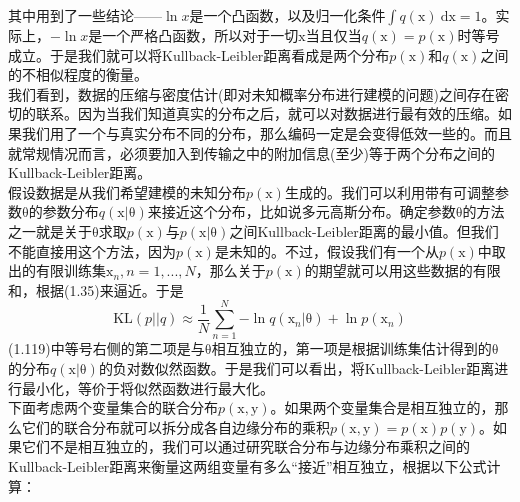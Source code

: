 \documentclass[b5paper]{book}
\numberwithin{equation}{chapter}
\begin{document}
{	其中用到了一些结论——$\ln x$是一个凸函数，以及归一化条件$\int q(\boldsymbol{\mathrm{x}})\ \mathrm{d}\boldsymbol{\mathrm{x}} = 1$。实际上，$-\ln x$是一个严格凸函数，所以对于一切$\boldsymbol{\mathrm{x}}$当且仅当$q(\boldsymbol{\mathrm{x}})=p(\boldsymbol{\mathrm{x}})$时等号成立。于是我们就可以将Kullback-Leibler距离看成是两个分布$p(\boldsymbol{\mathrm{x}})$和$q(\boldsymbol{\mathrm{x}})$之间的不相似程度的衡量。\\
	\indent 我们看到，数据的压缩与密度估计(即对未知概率分布进行建模的问题)之间存在密切的联系。因为当我们知道真实的分布之后，就可以对数据进行最有效的压缩。如果我们用了一个与真实分布不同的分布，那么编码一定是会变得低效一些的。而且就常规情况而言，必须要加入到传输之中的附加信息(至少)等于两个分布之间的Kullback-Leibler距离。\\
	\indent 假设数据是从我们希望建模的未知分布$p(\boldsymbol{\mathrm{x}})$生成的。我们可以利用带有可调整参数$\boldsymbol{\mathrm{\theta}}$的参数分布$q(\boldsymbol{\mathrm{x}}|\boldsymbol{\mathrm{\theta}})$来接近这个分布，比如说多元高斯分布。确定参数$\boldsymbol{\mathrm{\theta}}$的方法之一就是关于$\boldsymbol{\mathrm{\theta}}$求取$p(\boldsymbol{\mathrm{x}})$与$p(\boldsymbol{\mathrm{x}}|\boldsymbol{\mathrm{\theta}})$之间Kullback-Leibler距离的最小值。但我们不能直接用这个方法，因为$p(\boldsymbol{\mathrm{x}})$是未知的。不过，假设我们有一个从$p(\boldsymbol{\mathrm{x}})$中取出的有限训练集$\boldsymbol{\mathrm{x}}_n, n=1,...,N$，那么关于$p(\boldsymbol{\mathrm{x}})$的期望就可以用这些数据的有限和，根据(1.35)来逼近。于是
	\begin{equation}
		\mathrm{KL}(p||q)\approx \frac{1}{N}\sum_{n=1}^{N}{-\ln q(\boldsymbol{\mathrm{x}}_n|\boldsymbol{\mathrm{\theta}})+\ln p(\boldsymbol{\mathrm{x}}_n)}
	\end{equation}
	(1.119)中等号右侧的第二项是与$\boldsymbol{\mathrm{\theta}}$相互独立的，第一项是根据训练集估计得到的$\boldsymbol{\mathrm{\theta}}$的分布$q(\boldsymbol{\mathrm{x}}|\boldsymbol{\mathrm{\theta}})$的负对数似然函数。于是我们可以看出，将Kullback-Leibler距离进行最小化，等价于将似然函数进行最大化。\\
	\indent 下面考虑两个变量集合的联合分布$p(\boldsymbol{\mathrm{x}},\boldsymbol{\mathrm{y}})$。如果两个变量集合是相互独立的，那么它们的联合分布就可以拆分成各自边缘分布的乘积$p(\boldsymbol{\mathrm{x}},\boldsymbol{\mathrm{y}})=p(\boldsymbol{\mathrm{x}})p(\boldsymbol{\mathrm{y}})$。如果它们不是相互独立的，我们可以通过研究联合分布与边缘分布乘积之间的Kullback-Leibler距离来衡量这两组变量有多么“接近”相互独立，根据以下公式计算：
	\begin{equation}

\end{equation}}
\end{document}
